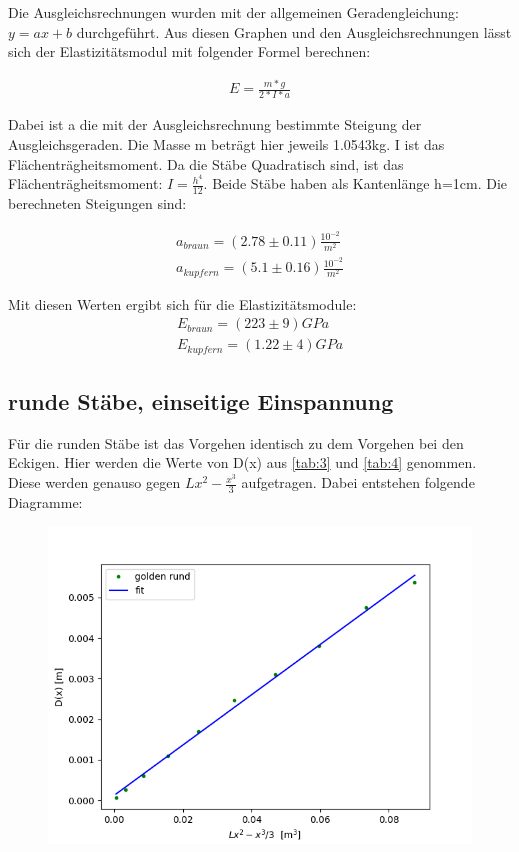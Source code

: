 Die Ausgleichsrechnungen wurden mit der allgemeinen Geradengleichung: $y = ax+b$ durchgeführt.
Aus diesen Graphen und den Ausgleichsrechnungen lässt sich der Elastizitätsmodul mit folgender Formel berechnen:

\begin{align*}
    E = \frac{m*g}{2*I*a}
\end{align*}

Dabei ist a die mit der Ausgleichsrechnung bestimmte Steigung der Ausgleichsgeraden. Die Masse m beträgt hier jeweils 1.0543kg.
I ist das Flächenträgheitsmoment. Da die Stäbe Quadratisch sind, ist das Flächenträgheitsmoment: $I=\frac{h^4}{12}$.
Beide Stäbe haben als Kantenlänge h=1cm. Die berechneten Steigungen sind:

\begin{align*}
    a_{braun} = (2.78\pm 0.11) \frac{10^{-2}}{m^2}\\
    a_{kupfern} = (5.1\pm 0.16) \frac{10^{-2}}{m^2} 
\end{align*}

Mit diesen Werten ergibt sich für die Elastizitätsmodule:
\begin{align*}
    E_{braun} = (223\pm 9) GPa \\
    E_{kupfern} = (1.22\pm 4) GPa
\end{align*}

\subsection{runde Stäbe, einseitige Einspannung}

Für die runden Stäbe ist das Vorgehen identisch zu dem Vorgehen bei den Eckigen. Hier werden die Werte von D(x) aus \ref{tab:3} und \ref{tab:4} genommen. Diese werden genauso gegen $Lx^2-\frac{x^3}{3}$ aufgetragen. Dabei entstehen folgende Diagramme:

\begin{figure}[H]
    \centering
    \includegraphics{gre.png}
\end{figure}

